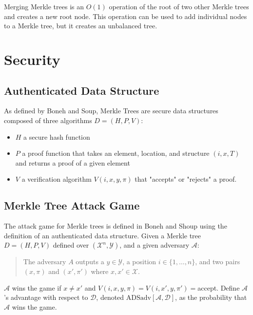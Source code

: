 \documentclass[12pt]{article}
\begin{document}
Merging Merkle trees is an $O(1)$ operation of the root of two other Merkle trees and creates a new root node. This operation can be used to add individual nodes to a Merkle tree, but it creates an unbalanced tree.



\section{Security}


\subsection{Authenticated Data Structure}

As defined by Boneh and Soup, Merkle Trees are secure data structures composed of three algorithms $D = (H, P, V )$\cite{boneh2020graduate}:
\begin{itemize}
	\item $H$ a secure hash function
	\item $P$ a proof function that takes an element, location, and structure $(i, x, T)$ and returns a proof of a given element
	\item $V$ a verification algorithm $V (i, x, y, \pi)$ that "accepts" or "rejects" a proof.
\end{itemize}

\subsection{Merkle Tree Attack Game}



The attack game for Merkle trees is defined in Boneh and Shoup using the definition of an authenticated data structure. Given a Merkle tree $D = (H, P, V )$ defined over $(\mathcal{X}^{n}, \mathcal{Y})$, and a given adversary $\mathcal{A}$: 

\begin{quote}
	The adversary $A$ outputs a $y \in \mathcal{Y}$, a position $i \in \{1, \ldots , n\}$, and two pairs $(x, \pi)$ and $(x', \pi')$ where $x, x' \in \mathcal{X}$.
\end{quote}

$\mathcal{A}$ wins the game if $x \neq x'$ and $V(i, x, y, \pi)=V(i, x', y, \pi')=$accept. Define $\mathcal{A}$'s advantage with respect to $\mathcal{D}$, denoted $\mathrm{ADSadv}[\mathcal{A}, \mathcal{D}]$, as the probability that $\mathcal{A}$ wins the game\cite{boneh2020graduate}.
\end{document}
